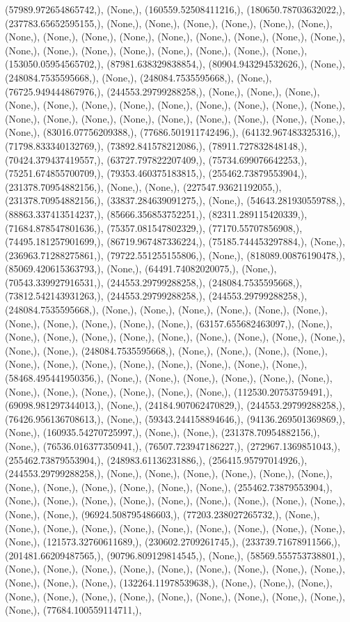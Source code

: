 \documentclass{article}
\begin{document}
(57989.972654865742,), (None,), (160559.52508411216,), (180650.78703632022,), (237783.65652595155,), (None,), (None,), (None,), (None,), (None,), (None,), (None,), (None,), (None,), (None,), (None,), (None,), (None,), (None,), (None,), (None,), (None,), (None,), (None,), (None,), (None,), (None,), (None,), (153050.05954565702,), (87981.638329838854,), (80904.943294532626,), (None,), (248084.7535595668,), (None,), (248084.7535595668,), (None,), (76725.949444867976,), (244553.29799288258,), (None,), (None,), (None,), (None,), (None,), (None,), (None,), (None,), (None,), (None,), (None,), (None,), (None,), (None,), (None,), (None,), (None,), (None,), (None,), (None,), (None,), (None,), (83016.07756209388,), (77686.501911742496,), (64132.967483325316,), (71798.833340132769,), (73892.841578212086,), (78911.727832848148,), (70424.379437419557,), (63727.797822207409,), (75734.699076642253,), (75251.674855700709,), (79353.460375183815,), (255462.73879553904,), (231378.70954882156,), (None,), (None,), (227547.93621192055,), (231378.70954882156,), (33837.284639091275,), (None,), (54643.281930559788,), (88863.337413514237,), (85666.356853752251,), (82311.289115420339,), (71684.878547801636,), (75357.081547802329,), (77170.55707856908,), (74495.181257901699,), (86719.967487336224,), (75185.744453297884,), (None,), (236963.71288275861,), (79722.551255155806,), (None,), (818089.00876190478,), (85069.420615363793,), (None,), (64491.74082020075,), (None,), (70543.339927916531,), (244553.29799288258,), (248084.7535595668,), (73812.542143931263,), (244553.29799288258,), (244553.29799288258,), (248084.7535595668,), (None,), (None,), (None,), (None,), (None,), (None,), (None,), (None,), (None,), (None,), (None,), (63157.655682463097,), (None,), (None,), (None,), (None,), (None,), (None,), (None,), (None,), (None,), (None,), (None,), (None,), (248084.7535595668,), (None,), (None,), (None,), (None,), (None,), (None,), (None,), (None,), (None,), (None,), (None,), (None,), (58468.495441950356,), (None,), (None,), (None,), (None,), (None,), (None,), (None,), (None,), (None,), (None,), (None,), (None,), (112530.20753759491,), (69098.981297344013,), (None,), (24184.907062470829,), (244553.29799288258,), (76426.956136708613,), (None,), (59343.244158894646,), (94136.269501369869,), (None,), (160935.54270725997,), (None,), (None,), (231378.70954882156,), (None,), (76536.016377350941,), (76507.723947186227,), (272967.1369851043,), (255462.73879553904,), (248983.61136231886,), (256415.95797014926,), (244553.29799288258,), (None,), (None,), (None,), (None,), (None,), (None,), (None,), (None,), (None,), (None,), (None,), (None,), (255462.73879553904,), (None,), (None,), (None,), (None,), (None,), (None,), (None,), (None,), (None,), (None,), (None,), (96924.508795486603,), (77203.238027265732,), (None,), (None,), (None,), (None,), (None,), (None,), (None,), (None,), (None,), (None,), (None,), (121573.32760611689,), (230602.2709261745,), (233739.71678911566,), (201481.66209487565,), (90796.809129814545,), (None,), (58569.555753738801,), (None,), (None,), (None,), (None,), (None,), (None,), (None,), (None,), (None,), (None,), (None,), (None,), (132264.11978539638,), (None,), (None,), (None,), (None,), (None,), (None,), (None,), (None,), (None,), (None,), (None,), (None,), (None,), (77684.100559114711,), 
\end{document}
